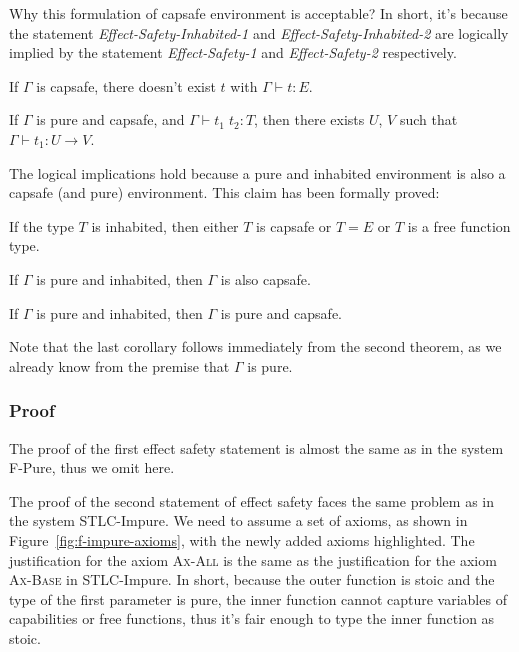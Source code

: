 Why this formulation of capsafe environment is acceptable? In short,
it's because the statement \emph{Effect-Safety-Inhabited-1} and
\emph{Effect-Safety-Inhabited-2} are logically implied by the
statement \emph{Effect-Safety-1} and \emph{Effect-Safety-2}
respectively.

\begin{definition}
  If $\Gamma$ is capsafe, there doesn't exist $t$ with
  $\Gamma \vdash t : E$.
\end{definition}

\begin{definition}
  If $\Gamma$ is pure and capsafe, and $\Gamma \vdash t_1 \; t_2 : T$,
  then there exists $U$, $V$ such that $\Gamma \vdash t_1 : U \to V$.
\end{definition}

The logical implications hold because a pure and inhabited
environment is also a capsafe (and pure) environment. This claim has
been formally proved:

\begin{lemma}
  If the type $T$ is inhabited, then either $T$ is capsafe or
  $T = E$ or $T$ is a free function type.
\end{lemma}

\begin{theorem}
  If $\Gamma$ is pure and inhabited, then $\Gamma$ is also capsafe.
\end{theorem}

\begin{corollary}
  If $\Gamma$ is pure and inhabited, then $\Gamma$ is pure and
  capsafe.
\end{corollary}

Note that the last corollary follows immediately from the second
theorem, as we already know from the premise that $\Gamma$ is pure.

\subsubsection{Proof}

The proof of the first effect safety statement is almost the same as
in the system F-Pure, thus we omit here.

The proof of the second statement of effect safety faces the same
problem as in the system STLC-Impure. We need to assume a set of
axioms, as shown in Figure~\ref{fig:f-impure-axioms}, with the newly
added axioms highlighted. The justification for the axiom
\textsc{Ax-All} is the same as the justification for the axiom
\textsc{Ax-Base} in STLC-Impure. In short, because the outer function
is stoic and the type of the first parameter is pure, the inner
function cannot capture variables of capabilities or free functions,
thus it's fair enough to type the inner function as stoic.

